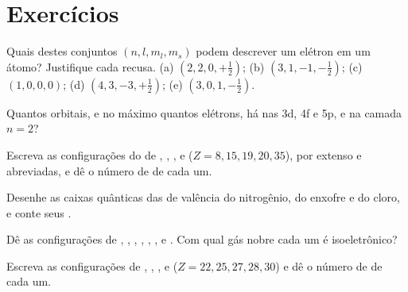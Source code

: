 \section{Exercícios}

\begin{exercise}[$\star$]\label{exo:b1:quantum-numbers:1}
Quais destes conjuntos $(n, l, m_l, m_s)$ podem descrever um elétron em
um átomo? Justifique cada recusa.
(a) $(2, 2, 0, +\tfrac12)$; (b) $(3, 1, -1, -\tfrac12)$;
(c) $(1, 0, 0, 0)$; (d) $(4, 3, -3, +\tfrac12)$; (e) $(3, 0, 1, -\tfrac12)$.
\end{exercise}

\begin{exercise}[$\star$]\label{exo:b1:quantum-numbers:2}
Quantos orbitais, e no máximo quantos elétrons, há nas  3d, 4f
e 5p, e na camada $n = 2$?
\end{exercise}

\begin{exercise}[$\star$]\label{exo:b1:quantum-numbers:3}
Escreva as configurações do  de , , , 
e  ($Z = 8, 15, 19, 20, 35$), por extenso e abreviadas, e dê o
número de  de cada um.
\end{exercise}

\begin{exercise}[$\star$]\label{exo:b1:quantum-numbers:4}
Desenhe as caixas quânticas das  de valência do nitrogênio, do
enxofre e do cloro, e conte seus .
\end{exercise}

\begin{exercise}[$\star\star$]\label{exo:b1:quantum-numbers:5}
Dê as configurações de , , , ,
, ,  e . Com qual gás nobre
cada um é isoeletrônico?
\end{exercise}

\begin{exercise}[$\star\star$]\label{exo:b1:quantum-numbers:6}
Escreva as configurações de , , ,
 e  ($Z = 22, 25, 27, 28, 30$) e dê o
número de  de cada um.
\end{exercise}


